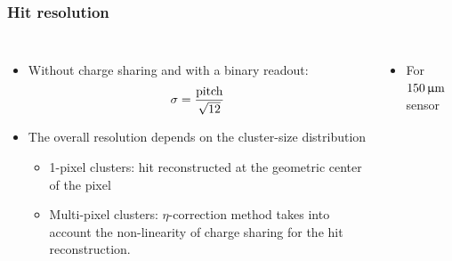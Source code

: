 \begin{frame}
  \frametitle{Hit resolution}

  \begin{columns}[t]
    \begin{itemize}
    \item Without charge sharing and with a binary readout: \\
      \begin{equation*}
        \sigma={\text{pitch} \over \sqrt{12}}
      \end{equation*}
    \item The overall resolution depends on the cluster-size
      distribution
      \begin{itemize}
      \item 1-pixel clusters: hit reconstructed at the geometric center
        of the pixel
      \item Multi-pixel clusters: $\eta$-correction method takes into
        account the non-linearity of charge sharing for the hit
        reconstruction.
      \end{itemize}
    \end{itemize}

  

    \begin{itemize}
    \item For $150\,\upmu\mathrm{m}$ sensor
    \end{itemize}

    \centering


  \end{columns}
  
\end{frame}


